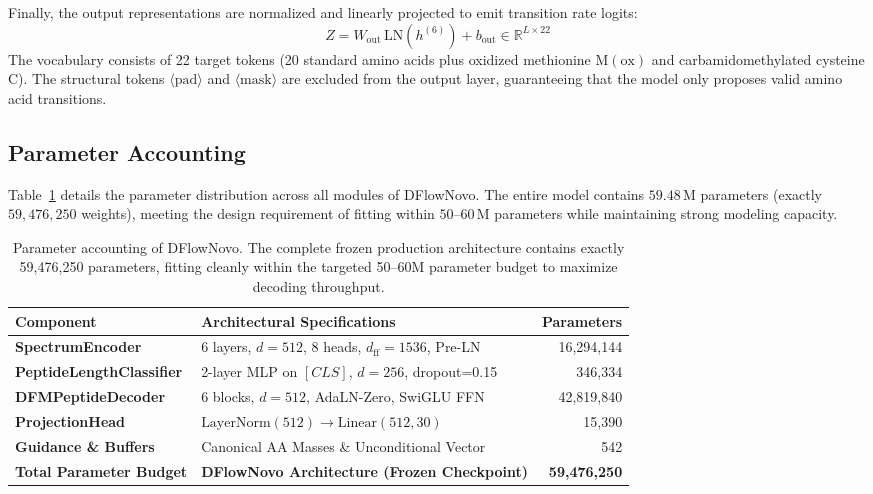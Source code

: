 Finally, the output representations are normalized and linearly projected to emit transition rate logits:
\begin{equation}
Z = W_{\text{out}} \, \text{LN}(h^{(6)}) + b_{\text{out}} \in \mathbb{R}^{L \times 22}
\label{eq:logits_output}
\end{equation}
The vocabulary consists of 22 target tokens (20 standard amino acids plus oxidized methionine $\text{M}(\text{ox})$ and carbamidomethylated cysteine $\text{C}$). The structural tokens $\langle\text{pad}\rangle$ and $\langle\text{mask}\rangle$ are excluded from the output layer, guaranteeing that the model only proposes valid amino acid transitions.

\subsection{Parameter Accounting}
\label{subsec:parameter_budget}

Table~\ref{tab:parameter_budget} details the parameter distribution across all modules of DFlowNovo. The entire model contains $59.48\,\text{M}$ parameters (exactly $59,476,250$ weights), meeting the design requirement of fitting within $50\text{--}60\,\text{M}$ parameters while maintaining strong modeling capacity.

\begin{table}[!ht]
\centering
\small
\begin{tabular}{llr}
\toprule
\textbf{Component} & \textbf{Architectural Specifications} & \textbf{Parameters} \\
\midrule
\textbf{SpectrumEncoder} & 6 layers, $d=512$, 8 heads, $d_{\text{ff}}=1536$, Pre-LN & 16,294,144 \\
\textbf{PeptideLengthClassifier} & 2-layer MLP on $[CLS]$, $d=256$, dropout=0.15 & 346,334 \\
\textbf{DFMPeptideDecoder} & 6 blocks, $d=512$, AdaLN-Zero, SwiGLU FFN & 42,819,840 \\
\textbf{ProjectionHead} & $\text{LayerNorm}(512) \to \text{Linear}(512, 30)$ & 15,390 \\
\textbf{Guidance \& Buffers} & Canonical AA Masses \& Unconditional Vector & 542 \\
\midrule
\textbf{Total Parameter Budget} & \textbf{DFlowNovo Architecture (Frozen Checkpoint)} & \textbf{59,476,250} \\
\bottomrule
\end{tabular}
\caption{Parameter accounting of DFlowNovo. The complete frozen production architecture contains exactly 59,476,250 parameters, fitting cleanly within the targeted 50--60M parameter budget to maximize decoding throughput.}
\label{tab:parameter_budget}
\end{table}

